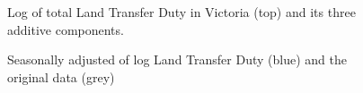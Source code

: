 \documentclass[
  11pt,
  a4paper,
]{article}
\begin{document}
\begin{figure}


\caption{\label{fig-dcmp}Log of total Land Transfer Duty in Victoria
(top) and its three additive components.}

\end{figure}%

\begin{figure}


\caption{\label{fig-ssadj}Seasonally adjusted of log Land Transfer Duty
(blue) and the original data (grey)}

\end{figure}%
\end{document}
